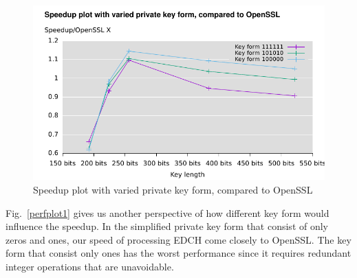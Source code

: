 \begin{figure}[h!]\centering
  \includegraphics[scale=0.7]{keysize}
  \caption{Speedup plot with varied private key form, compared to OpenSSL\label{keysize}}
\end{figure}
Fig.~\ref{perfplot1} gives us another perspective of how different key form would influence the speedup. In the simplified private key form that consist of only zeros and ones, our speed of processing EDCH come closely to OpenSSL. The key form that consist only ones has the worst performance since it requires redundant integer operations that are unavoidable. 